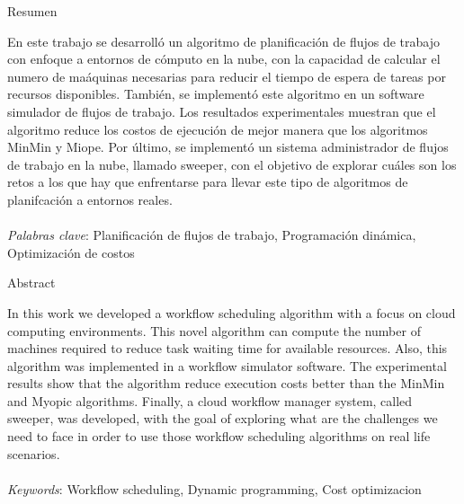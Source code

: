 \begin{center}
Resumen
\end{center}
\noindent En este trabajo se desarroll\'o un algoritmo de planificaci\'on de flujos de trabajo con enfoque a entornos de c\'omputo en la nube, con la capacidad de calcular el numero de ma\'aquinas necesarias para reducir el tiempo de espera de tareas por recursos disponibles. Tambi\'en, se implement\'o este algoritmo en un software simulador de flujos de trabajo. Los resultados experimentales muestran que el algoritmo reduce los costos de ejecuci\'on de mejor manera que los algoritmos MinMin y Miope. Por \'ultimo, se implement\'o un sistema administrador de flujos de trabajo en la nube, llamado sweeper, con el objetivo de explorar cu\'ales son los retos a los que hay que enfrentarse para llevar este tipo de algoritmos de planifcaci\'on a entornos reales.
\\\\
\noindent \emph{Palabras clave}: Planificación de flujos de trabajo, Programaci\'on din\'amica, Optimizaci\'on de costos

\begin{center}
Abstract
\end{center}
\noindent In this work we developed a workflow scheduling algorithm with a focus on cloud computing environments. This novel algorithm can compute the number of machines required to reduce task waiting time for available resources. Also, this algorithm was implemented in a workflow simulator software. The experimental results show that the algorithm reduce execution costs better than the MinMin and Myopic algorithms. Finally, a cloud workflow manager system, called sweeper, was developed, with the goal of exploring what are the challenges we need to face in order to use those workflow scheduling algorithms on real life scenarios.
\\\\
\noindent \emph{Keywords}: Workflow scheduling, Dynamic programming, Cost optimizacion

\clearpage